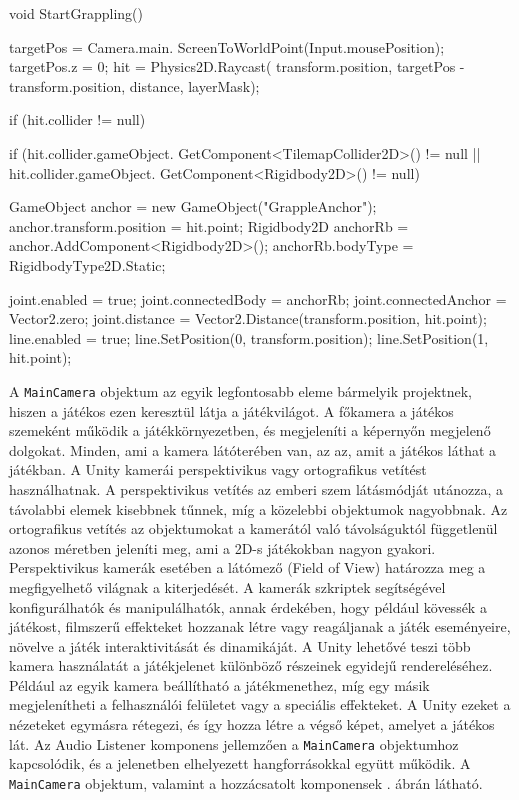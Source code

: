 \begin{java}
void StartGrappling()
{
    targetPos = 
        Camera.main.
        ScreenToWorldPoint(Input.mousePosition);
    targetPos.z = 0;
    hit = 
        Physics2D.Raycast(
            transform.position, 
            targetPos - transform.position, 
            distance, layerMask);

    if (hit.collider != null)
    {
        if (hit.collider.gameObject.
            GetComponent<TilemapCollider2D>() != null || 
            hit.collider.gameObject.
            GetComponent<Rigidbody2D>() != null)
        {
            GameObject anchor = 
                new GameObject("GrappleAnchor");
            anchor.transform.position = hit.point;
            Rigidbody2D anchorRb = 
                anchor.AddComponent<Rigidbody2D>();
            anchorRb.bodyType = 
                RigidbodyType2D.Static;

            joint.enabled = true;
            joint.connectedBody = anchorRb;
            joint.connectedAnchor = Vector2.zero;
            joint.distance = 
                Vector2.Distance(transform.position, 
                hit.point);
            line.enabled = true;
            line.SetPosition(0, transform.position);
            line.SetPosition(1, hit.point);
        }
    }
}
\end{java}


A \texttt{MainCamera} objektum az egyik legfontosabb eleme bármelyik projektnek, hiszen a játékos ezen keresztül látja a játékvilágot. A főkamera a játékos szemeként működik a játékkörnyezetben, és megjeleníti a képernyőn megjelenő dolgokat. Minden, ami a kamera látóterében van, az az, amit a játékos láthat a játékban. A Unity kamerái perspektivikus vagy ortografikus vetítést használhatnak. A perspektivikus vetítés az emberi szem látásmódját utánozza, a távolabbi elemek kisebbnek tűnnek, míg a közelebbi objektumok nagyobbnak. Az ortografikus vetítés az objektumokat a kamerától való távolságuktól függetlenül azonos méretben jeleníti meg, ami a 2D-s játékokban nagyon gyakori. Perspektivikus kamerák esetében a látómező (Field of View) határozza meg a megfigyelhető világnak a kiterjedését. A kamerák szkriptek segítségével konfigurálhatók és manipulálhatók, annak érdekében, hogy például kövessék a játékost, filmszerű effekteket hozzanak létre vagy reagáljanak a játék eseményeire, növelve a játék interaktivitását és dinamikáját. A Unity lehetővé teszi több kamera használatát a játékjelenet különböző részeinek egyidejű rendereléséhez. Például az egyik kamera beállítható a játékmenethez, míg egy másik megjelenítheti a felhasználói felületet vagy a speciális effekteket. A Unity ezeket a nézeteket egymásra rétegezi, és így hozza létre a végső képet, amelyet a játékos lát. Az Audio Listener komponens jellemzően a \texttt{MainCamera} objektumhoz kapcsolódik, és a jelenetben elhelyezett hangforrásokkal együtt működik.\cite{cameracomponent} A \texttt{MainCamera} objektum, valamint a hozzácsatolt komponensek . ábrán látható.

